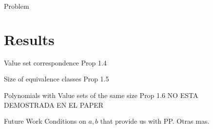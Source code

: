 \documentclass{beamer}
\begin{document}
\begin{frame}{Problem}
  
\end{frame}

\section{Results} %
\label{sec:results}

\begin{frame}{Value set correspondence}
  Prop 1.4
\end{frame}

\begin{frame}{Size of equivalence classes}
  Prop 1.5
\end{frame}

\begin{frame}{Polynomials with Value sets of the same size}
  Prop 1.6 NO ESTA DEMOSTRADA EN EL PAPER
\end{frame}

\begin{frame}{Future Work}
  Conditions on $a,b$ that provide us with PP.
  Otras mas.
\end{frame}

\end{document}

